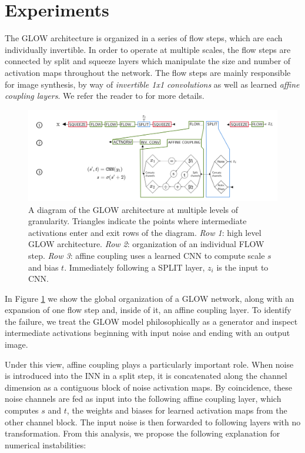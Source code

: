 \section{Experiments}

The GLOW architecture is organized in a series of flow steps, which are each individually invertible. In order to operate at multiple scales, the flow steps are connected by split and squeeze layers which manipulate the size and number of activation maps throughout the network. The flow steps are mainly responsible for image synthesis, by way of \textit{invertible 1x1 convolutions} as well as learned \textit{affine coupling layers}. We refer the reader to \cite{kingma2018glow} for more details.

\begin{figure}
    \centering
    \includegraphics[width=\textwidth]{figures/Glow.png}
    \caption{A diagram of the GLOW architecture at multiple levels of granularity. Triangles indicate the points where intermediate activations enter and exit rows of the diagram. \textit{Row 1}: high level GLOW architecture. \textit{Row 2}: organization of an individual FLOW step. \textit{Row 3}: affine coupling uses a learned CNN to compute scale $s$ and bias $t$. Immediately following a SPLIT layer, $z_i$ is the input to CNN.}
    \label{fig:glow_architecture}
\end{figure}
In Figure \ref{fig:glow_architecture} we show the global organization of a GLOW network, along with an expansion of one flow step and, inside of it, an affine coupling layer. To identify the failure, we treat the GLOW model philosophically as a generator and inspect intermediate activations beginning with input noise and ending with an output image. 

Under this view, affine coupling plays a particularly important role. When noise is introduced into the INN in a split step, it is concatenated along the channel dimension as a contiguous block of noise activation maps. By coincidence, these noise channels are fed as input into the following affine coupling layer, which computes $s$ and $t$, the weights and biases for learned activation maps from the other channel block. The input noise is then forwarded to following layers with no transformation. From this analysis, we propose the following explanation for numerical instabilities:

